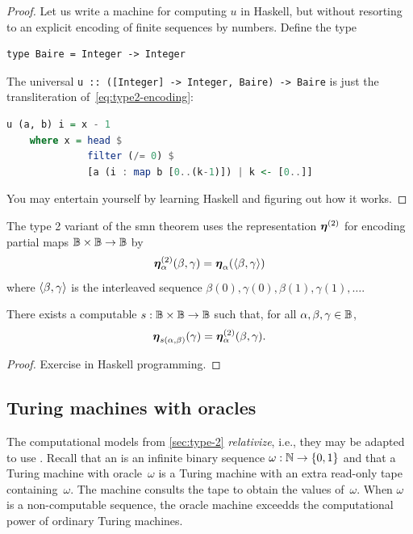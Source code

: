 \begin{proof}
  Let us write a machine for computing $u$ in Haskell, but without
  resorting to an explicit encoding of finite sequences by numbers.
  Define the type
\begin{lstlisting}
type Baire = Integer -> Integer
\end{lstlisting}
  The universal \lstinline!u :: ([Integer] -> Integer, Baire) -> Baire! %
  is just the transliteration of~\eqref{eq:type2-encoding}:
\begin{lstlisting}[language=Haskell]
u (a, b) i = x - 1
    where x = head $
              filter (/= 0) $
              [a (i : map b [0..(k-1)]) | k <- [0..]]
\end{lstlisting}
  You may entertain yourself by learning Haskell and figuring out how
  it works.
\end{proof}

The type 2 variant of the smn theorem uses the representation
$\text{\boldmath{$\eta$}}^{(2)}$ for encoding partial maps $\mathbb{B} \times \mathbb{B} \to
\mathbb{B}$ by
%
\begin{equation*}
  \text{\boldmath{$\eta$}}^{(2)}_{\alpha}(\beta, \gamma) = \text{\boldmath{$\eta$}}_{\alpha}(\langle \beta, \gamma \rangle)
\end{equation*}
%
where $\langle \beta, \gamma \rangle$ is the interleaved sequence $\beta(0), \gamma(0), \beta(1), \gamma(1), \ldots$.

\begin{theorem}
  \label{th:type-2-smd}%
  There exists a computable $s : \mathbb{B} \times \mathbb{B} \to \mathbb{B}$ such
  that, for all $\alpha, \beta, \gamma \in \mathbb{B}$,
  \begin{equation*}
    \text{\boldmath{$\eta$}}_{s(\alpha, \beta)}(\gamma) = \text{\boldmath{$\eta$}}^{(2)}_{\alpha}(\beta, \gamma).
  \end{equation*}
\end{theorem}

\begin{proof}
  Exercise in Haskell programming.
\end{proof}

\subsection{Turing machines with oracles}
\label{sec:turing-machines-with}

The computational models from \ref{sec:type-2} \emph{relativize}, i.e.,
they may be adapted to use . Recall that an  is an infinite binary sequence $\omega : \mathbb{N} \to \{0, 1\}$ and that a Turing machine with oracle~$\omega$ is a Turing machine with an extra read-only tape containing~$\omega$. The machine consults the tape to obtain the values of~$\omega$.
When $\omega$ is a non-computable sequence, the oracle machine exceedds the computational power of ordinary Turing machines.

